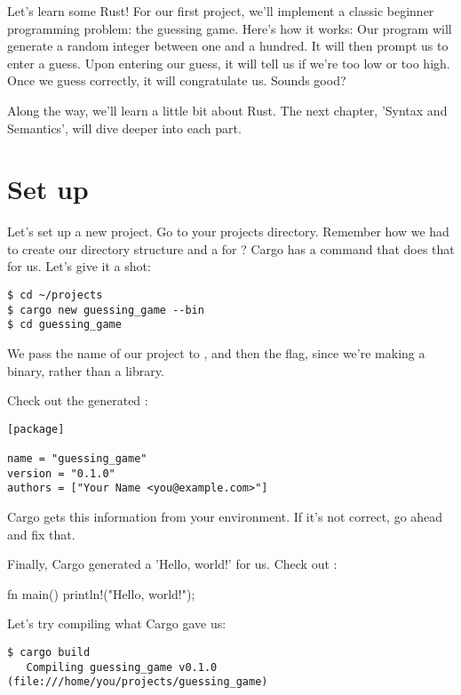 Let's learn some Rust! For our first project, we'll implement a classic beginner programming problem: the guessing game. 
Here's how it works: Our program will generate a random integer between one and a hundred. It will then prompt us to enter 
a guess. Upon entering our guess, it will tell us if we're too low or too high. Once we guess correctly, it will congratulate 
us. Sounds good?

\blank

Along the way, we'll learn a little bit about Rust. The next chapter, 'Syntax and Semantics', will dive deeper into each part.

\section{Set up}

Let's set up a new project. Go to your projects directory. Remember how we had to create our directory structure and a 
 for ? Cargo has a command that does that for us. Let's give it a shot:

\begin{verbatim}
$ cd ~/projects
$ cargo new guessing_game --bin
$ cd guessing_game
\end{verbatim}

We pass the name of our project to , and then the  flag, since we're making a binary, rather than 
a library.

\blank

Check out the generated :

\begin{verbatim}
[package]

name = "guessing_game"
version = "0.1.0"
authors = ["Your Name <you@example.com>"]
\end{verbatim}

Cargo gets this information from your environment. If it's not correct, go ahead and fix that.

\blank

Finally, Cargo generated a 'Hello, world!' for us. Check out :

\begin{rustc}
fn main() {
    println!("Hello, world!");
}
\end{rustc}

Let's try compiling what Cargo gave us:

\begin{verbatim}
$ cargo build
   Compiling guessing_game v0.1.0 (file:///home/you/projects/guessing_game)  
\end{verbatim}

